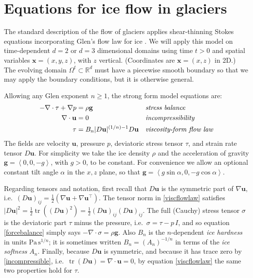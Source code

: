 \documentclass[letterpaper,final,12pt,reqno]{amsart}
\newcommand{\RR}{\mathbb{R}}
\newcommand{\grad}{\nabla}
\newcommand{\Div}{\nabla\cdot}
\newcommand{\trace}{\operatorname{tr}}
\newcommand{\bg}{\mathbf{g}}
\newcommand{\bu}{\mathbf{u}}
\newcommand{\bx}{\mathbf{x}}
\begin{document}
\section{Equations for ice flow in glaciers} \label{sec:strongform}

The standard description of the flow of glaciers applies shear-thinning Stokes equations incorporating Glen's flow law for ice \cite{GreveBlatter2009,JouvetRappaz2011,SchoofHewitt2013}.  We will apply this model on time-dependent $d=2$ or $d=3$ dimensional domains using time $t>0$ and spatial variables $\bx=(x,y,z)$, with $z$ vertical.  (Coordinates are $\bx=(x,z)$ in 2D.)  The evolving domain $\Omega^t \subset \RR^d$ must have a piecewise smooth boundary so that we may apply the boundary conditions, but it is otherwise general.

Allowing any Glen exponent $n\ge 1$, the strong form model equations are:
\begin{align}
- \nabla \cdot \tau + \nabla p &= \rho \bg &&\text{\emph{stress balance}} \label{forcebalance} \\
\nabla \cdot \bu &= 0 &&\text{\emph{incompressibility}} \label{incompressible} \\
\tau &= B_n |D\bu|^{(1/n) - 1} D\bu  &&\text{\emph{viscosity-form flow law}} \label{viscflowlaw}
\end{align}
The fields are velocity $\bu$, pressure $p$, deviatoric stress tensor $\tau$, and strain rate tensor $D\bu$.  For simplicity we take the ice density $\rho$ and the acceleration of gravity $\bg=\left<0,0,-g\right>$, with $g>0$, to be constant.  For convenience we allow an optional constant tilt angle $\alpha$ in the $x,z$ plane, so that $\bg = \left<g\sin\alpha,0,-g\cos\alpha\right>$.

Regarding tensors and notation, first recall that $D\bu$ is the symmetric part of $\grad \bu$, i.e.~$(D\bu)_{ij} = \frac{1}{2} \left(\grad\bu + \grad\bu^\top\right)$.  The tensor norm in \eqref{viscflowlaw} satisfies $|D\bu|^2 = \frac{1}{2} \trace\left((D\bu)^2\right) = \frac{1}{2} (D\bu)_{ij} (D\bu)_{ij}$.  The full (Cauchy) stress tensor $\sigma$ is the deviatoric part $\tau$ minus the pressure, i.e.~$\sigma = \tau - p\,I$, and so equation \eqref{forcebalance} simply says $-\Div \sigma = \rho \bg$.  Also $B_n$ is the $n$-dependent \emph{ice hardness} in units $\text{Pa}\,\text{s}^{1/n}$; it is sometimes written $B_n = (A_n)^{-1/n}$ in terms of the \emph{ice softness} $A_n$.  Finally, because $D\bu$ is symmetric, and because it has trace zero by \eqref{incompressible}, i.e.~$\trace(D\bu)=\nabla \cdot \bu = 0$, by equation \eqref{viscflowlaw} the same two properties hold for $\tau$.
\end{document}
